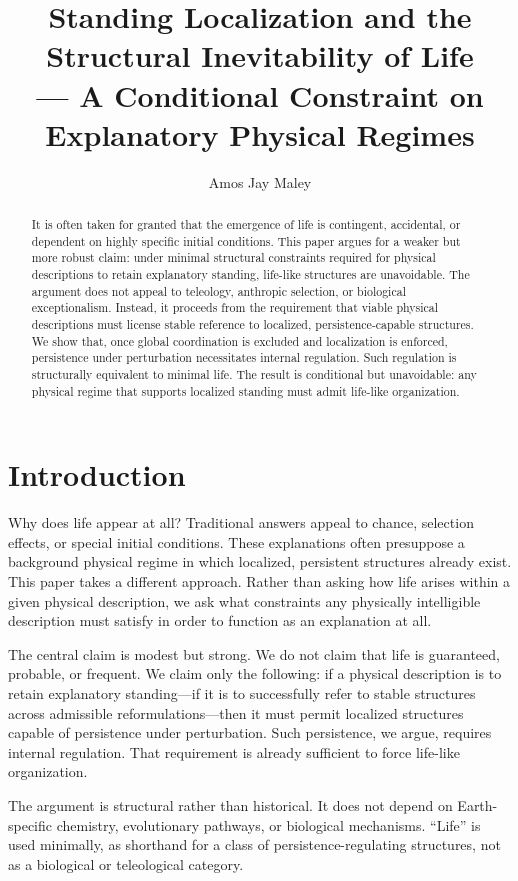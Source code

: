 \documentclass[11pt]{article}
\title{Standing Localization and the Structural Inevitability of Life\\
\large --- A Conditional Constraint on Explanatory Physical Regimes}
\author{Amos Jay Maley}
\date{}
\begin{document}
\maketitle

\begin{abstract}
It is often taken for granted that the emergence of life is contingent, accidental, or dependent on highly specific initial conditions. This paper argues for a weaker but more robust claim: under minimal structural constraints required for physical descriptions to retain explanatory standing, life-like structures are unavoidable. The argument does not appeal to teleology, anthropic selection, or biological exceptionalism. Instead, it proceeds from the requirement that viable physical descriptions must license stable reference to localized, persistence-capable structures. We show that, once global coordination is excluded and localization is enforced, persistence under perturbation necessitates internal regulation. Such regulation is structurally equivalent to minimal life. The result is conditional but unavoidable: any physical regime that supports localized standing must admit life-like organization.
\end{abstract}

\section{Introduction}

Why does life appear at all? Traditional answers appeal to chance, selection effects, or special initial conditions. These explanations often presuppose a background physical regime in which localized, persistent structures already exist. This paper takes a different approach. Rather than asking how life arises within a given physical description, we ask what constraints any physically intelligible description must satisfy in order to function as an explanation at all.

The central claim is modest but strong. We do not claim that life is guaranteed, probable, or frequent. We claim only the following: if a physical description is to retain explanatory standing---if it is to successfully refer to stable structures across admissible reformulations---then it must permit localized structures capable of persistence under perturbation. Such persistence, we argue, requires internal regulation. That requirement is already sufficient to force life-like organization.

The argument is structural rather than historical. It does not depend on Earth-specific chemistry, evolutionary pathways, or biological mechanisms. ``Life'' is used minimally, as shorthand for a class of persistence-regulating structures, not as a biological or teleological category.
\end{document}
